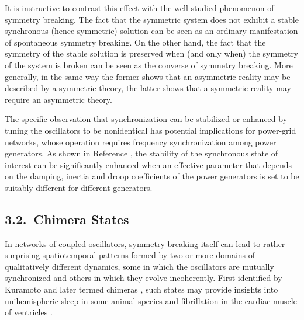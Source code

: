 \documentclass[
preprint,
superscriptaddress,
aps,
prl,
]{revtex4-1}
\begin{document}
It is instructive to contrast this effect with the well-studied phenomenon of symmetry breaking. The fact that the symmetric system does not exhibit a stable synchronous (hence symmetric) solution can be seen as an ordinary manifestation of spontaneous symmetry breaking. On the other hand, the fact that the symmetry of the stable solution is preserved when (and only when) the symmetry of the system is broken can be seen as the converse of symmetry breaking. More generally, 
in the same way the former shows that an asymmetric reality may be described by a symmetric theory, the latter shows that a symmetric reality may require an asymmetric theory.

The specific observation that synchronization can be stabilized or enhanced by tuning the oscillators to be nonidentical has potential implications for power-grid networks, whose operation requires frequency synchronization among power generators. As shown in Reference \cite{nishikawa2015stability}, the stability of the synchronous state of interest can be significantly enhanced when an effective parameter that depends on the damping, inertia and droop coefficients of the power generators is set to be suitably different for different generators.  

\subsection{3.2.~Chimera States}

In networks of coupled oscillators, symmetry breaking itself can lead to rather surprising spatiotemporal patterns formed by two or more domains of qualitatively different dynamics, some in which the oscillators are mutually synchronized and 
  {\color{black} others} in which they evolve incoherently. 
First identified by Kuramoto 
\cite{kuramoto2003reduction}
and later termed chimeras \cite{abrams2004chimera}, such states may provide insights into unihemispheric sleep  in some animal species \cite{rattenborg2000behavioral} and fibrillation in the cardiac muscle of ventricles \cite{davidenko1992stationary}.
\end{document}
